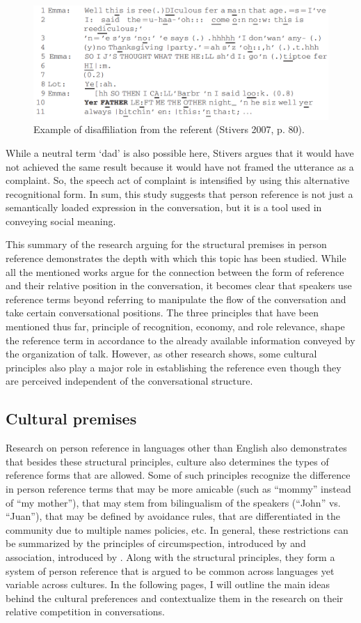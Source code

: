 \documentclass[12pt, draft]{article}
\begin{document}
\begin{figure}[h]
\caption{Example of disaffiliation from the referent (Stivers 2007, p. 80).}
\label{stivers}
\includegraphics[width=5in]{stivers.png}
\end{figure}
While a neutral term `dad' is also possible here, Stivers argues that it would have not achieved the same result because it would have not framed the utterance as a complaint. So, the speech act of complaint is intensified by using this alternative recognitional form. In sum, this study suggests that person reference is not just a semantically loaded expression in the conversation, but it is a tool used in conveying social meaning. 

This summary of the research arguing for the structural premises in person reference demonstrates the depth with which this topic has been studied. While all the mentioned works argue for the connection between the form of reference and their relative position in the conversation, it becomes clear that speakers use reference terms beyond referring to manipulate the flow of the conversation and take certain conversational positions. The three principles that have been mentioned thus far, principle of recognition, economy, and role relevance, shape the reference term in accordance to the already available information conveyed by the organization of talk. However, as other research shows, some cultural principles also play a major role in establishing the reference even though they are perceived independent of the conversational structure. 
  
\subsection{Cultural premises}
Research on person reference in languages other than English also demonstrates that besides these structural principles, culture also determines the types of reference forms that are allowed. Some of such principles recognize the difference in person reference terms that may be more amicable (such as ``mommy'' instead of ``my mother''), that may stem from bilingualism of the speakers (``John'' vs. ``Juan''), that may be defined by avoidance rules, that are differentiated in the community due to multiple names policies, etc. In general, these restrictions can be summarized by the principles of circumspection, introduced by \textcite{levinson2007} and association, introduced by \textcite{brown2007}. Along with the structural principles, they form a system of person reference that is argued to be common across languages yet variable across cultures. In the following pages, I will outline the main ideas behind the cultural preferences and contextualize them in the research on their relative competition in conversations.  
\end{document}
